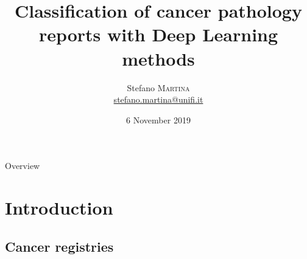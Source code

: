 






\title[]{\textbf{Classification of cancer pathology reports with Deep
  Learning methods}}
\date[6 November 2019]{6 November 2019}

\author[Stefano Martina]{
  \begin{center}
    \begin{tabular}{lr}
      Stefano \textsc{Martina}\\
      \href{mailto:stefano.martina@unifi.it}{stefano.martina@unifi.it}\\
    \end{tabular}
  \end{center}
}




\begin{frame}[plain]
  \titlepage
\end{frame}

\begin{frame}{Overview}
  \tableofcontents
\end{frame}

\section{Introduction}

\subsection{Cancer registries}

